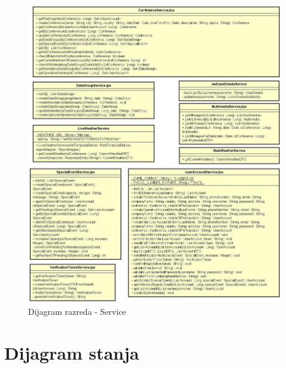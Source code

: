 			\newpage

			 \begin{figure}[H]
			\includegraphics[width=\textwidth]{slike/ServiceImpl Dijagram.jpg}
			\centering
			\caption{Dijagram razreda -  Service}
			\label{fig:dijagram_razreda_service}
			\end{figure}
			
			\newpage
			
	
			\eject
		
		\section{Dijagram stanja}
			
